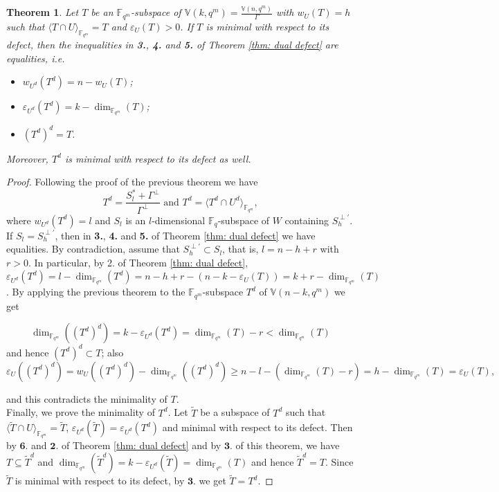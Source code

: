 \documentclass[11pt]{amsart}
\newtheorem{theorem}{Theorem}[section]
\newcommand{\fqm}{\mathbb{F}_{q^m}}
\newcommand{\fq}{{\mathbb F}_{q}}
\begin{document}
\begin{theorem} \label{thm: =dual defect}
Let $T$ be an $\fqm$-subspace of $\mathbb{V}(k,q^m)=\frac{\mathbb{V}(n,q^m)}{\Gamma}$ with $w_{U}(T)=h$ such that $\langle T \cap U \rangle_{\fqm}=T$ and $\varepsilon_{U}(T)>0$. If $T$ is minimal with respect to its defect, then the inequalities in {\bf 3.}, {\bf 4.} and {\bf 5.} of Theorem \ref{thm: dual defect} are equalities, i.e.
\begin{itemize}  
    \item[\bf 1.] $w_{U^d}(T^d) =n-w_{U}(T)$;
    \item[\bf 2.] $\varepsilon_{U^d}(T^d)=k- \dim_{\fqm} (T)$;
    \item[\bf 3.] $(T^d)^d = T$.    
\end{itemize}
Moreover, $T^d$ is minimal with respect to its defect as well.
\end{theorem}
\begin{proof}
Following the proof of the previous theorem we have
\[T^d=\frac{S_l^*+\Gamma^\perp}{\Gamma^\perp} \,\, \mbox{and} \,\,  T^d=  \langle T^d \cap U^d \rangle_{\fqm},\] where $w_{U^d}(T^d)=l$ and  $S_l$ is an $l$-dimensional $\fq$-subspace of $W$ containing $S_h^{\perp'}$. If $S_l=S_h^{\perp'}$, then in {\bf 3.}, {\bf 4.} and {\bf 5.} of Theorem \ref{thm: dual defect} we have equalities.
By contradiction, assume that $S_h^{\perp'}\subset S_l$, that is, $l=n-h+r$ with $r>0$. 
In particular, by 2. of Theorem \ref{thm: dual defect}, $\varepsilon_{U^d}(T^d)=l-\dim_{\fqm} (T^d)= n-h+r-(n-k-\varepsilon_{U}(T))=k+r-\dim_{\fqm} (T)$. 
By applying the previous theorem to the $\fqm$-subspace ${T}^d$ of $\mathbb{V}(n-k,q^m)$ we get

\[ \dim_{\fqm} ((T^d)^d)=k-\varepsilon_{U^d}(T^d)=\dim_{\fqm} (T)-r< \dim_{\fqm} (T)  \]
and hence $(T^d)^d \subset T$; also
\[ \varepsilon_{U}((T^d)^d)= w_{U}((T^d)^d)-\dim_{\fqm} ((T^d)^d) \geq n-l-(\dim_{\fqm} (T)-r)= h- \dim_{\fqm} (T)=\varepsilon_{U}(T),\]

and this contradicts the minimality of $T$.\\
Finally, we prove the minimality of $T^d$. Let $\tilde{T}$ be a subspace of $T^d$ such that $\langle \tilde{T} \cap U \rangle_{\fqm}=\tilde{T}$,  $\varepsilon_{U^d}(\tilde{T})=\varepsilon_{U^d}(T^d)$ and minimal with respect to its defect. Then by $\mathbf 6.$ and $\mathbf 2.$ of Theorem \ref{thm: dual defect} and by $\mathbf 3.$ of this theorem, we have $T\subseteq\tilde{T}^d$ and $\dim_{\fqm}( \tilde{T}^d)=k- \varepsilon_{U^d}(\tilde{T})=\dim_{\fqm} (T)$ and hence $\tilde{T}^d=T$. Since $\tilde{T}$ is minimal with respect to its defect, by $\mathbf 3.$ we get $\tilde{T}=T^d$.
\end{proof}
\end{document}
